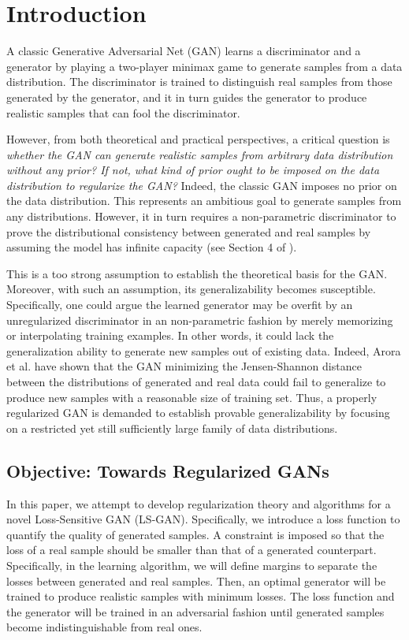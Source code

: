 \documentclass[11pt,fullpage, letterpaper,twoside]{article}
\newcommand{\1}[1]{\mathds{1}_{\left[#1\right]}}
\begin{document}
\section{Introduction}

A classic Generative Adversarial Net (GAN) \cite{goodfellow2014generative} learns a discriminator and a generator by playing a two-player minimax game to generate samples from a data distribution. The discriminator is trained to distinguish real samples from those generated by the generator, and it in turn guides the generator to produce realistic samples that can fool the discriminator.






However, from both theoretical and practical perspectives, a critical question is {\em whether the GAN can generate realistic samples from arbitrary data distribution without any prior? If not, what kind of prior ought to be imposed on the data distribution to regularize the GAN?} Indeed,
the classic GAN \cite{goodfellow2014generative} imposes no prior on the data distribution.  This represents an ambitious goal to
generate samples from any distributions. However, it in turn requires a non-parametric discriminator to prove the distributional consistency between generated and real samples by assuming the model has infinite capacity (see Section 4 of \cite{goodfellow2014generative}).

This is a too strong assumption to establish the theoretical basis for the GAN. Moreover, with such an assumption, its generalizability becomes susceptible.
Specifically, one could argue the learned generator may be overfit by an unregularized discriminator in an non-parametric fashion by merely memorizing or interpolating training examples. In other words, it could lack the generalization ability to generate new samples out of existing data. Indeed, Arora et al. \cite{arora2017generalization} have shown that the GAN minimizing the Jensen-Shannon distance between the distributions of generated and real data could fail to generalize to produce new samples with a reasonable size of training set.
Thus, a properly regularized GAN is demanded to establish provable generalizability by focusing on a restricted yet still sufficiently large family of data distributions.

\subsection{Objective: Towards Regularized GANs}
In this paper, we attempt to develop regularization theory and algorithms for a novel Loss-Sensitive GAN (LS-GAN).
Specifically, we introduce a loss function to quantify the quality of generated samples. A constraint is imposed so that the loss of a real sample should be smaller than that of a generated counterpart. Specifically, in the learning algorithm, we will define margins to separate the losses between generated and real samples. Then, an optimal generator will be trained to produce realistic samples with minimum losses. The loss function and the generator will be trained in an adversarial fashion until generated samples become indistinguishable from real ones.
\end{document}
